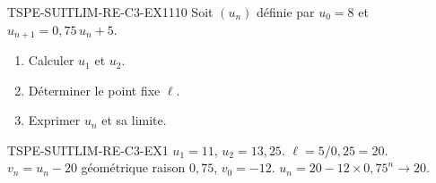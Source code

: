 

\begin{exercice}{TSPE-SUITLIM-RE-C3-EX1}{1}{10}
Soit $(u_n)$ définie par $u_0 = 8$ et $u_{n+1} = 0{,}75\,u_n + 5$.
\begin{enumerate}
  \item Calculer $u_1$ et $u_2$.
  \item Déterminer le point fixe $\ell$.
  \item Exprimer $u_n$ et sa limite.
\end{enumerate}
\end{exercice}


\begin{corrige}{TSPE-SUITLIM-RE-C3-EX1}
$u_1 = 11$, $u_2 = 13{,}25$. $\ell = 5/0{,}25 = 20$. $v_n = u_n - 20$ géométrique raison $0{,}75$, $v_0 = -12$. $u_n = 20 - 12 \times 0{,}75^n \to 20$.
\end{corrige}
